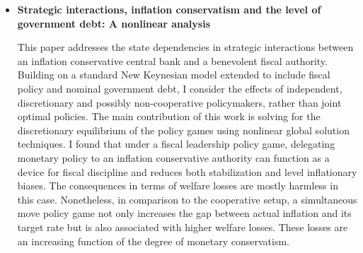 \begin{itemize}
\item{\textbf{Strategic interactions, inflation conservatism and the level of government debt: A nonlinear analysis}

\small{This paper addresses the state dependencies in strategic interactions between an inflation conservative central bank and a benevolent fiscal authority. Building on a standard New Keynesian model extended to include fiscal policy and nominal government debt, I consider the effects of independent, discretionary and possibly non-cooperative policymakers, rather than joint optimal policies. The main contribution of this work is solving for the discretionary equilibrium of the policy games using nonlinear global solution techniques. I found that under a fiscal leadership policy game, delegating monetary policy to an inflation conservative authority can function as a device for fiscal discipline and reduces both stabilization and level inflationary biases. The consequences in terms of welfare losses are mostly harmless in this case. Nonetheless, in comparison to the cooperative setup, a simultaneous move policy game not only increases the gap between actual inflation and its target rate but is also associated with higher welfare losses. These losses are an increasing function of the degree of monetary conservatism.}}
\end{itemize}